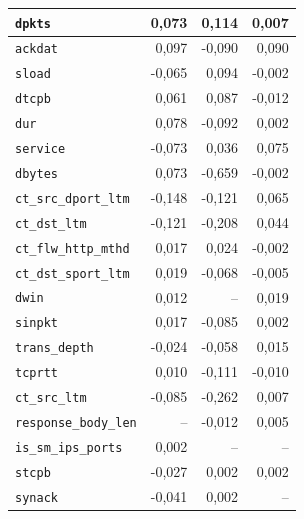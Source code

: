 \begin{table}[!ht]
\begin{tabular}{|l|r|r|r|}
        \hline
        \texttt{dpkts} & 0,073 & 0,114 & 0,007 \\
        \hline
        \texttt{ackdat} & 0,097 & -0,090 & 0,090 \\
        \hline
        \texttt{sload} & -0,065 & 0,094 & -0,002 \\
        \hline
        \texttt{dtcpb} & 0,061 & 0,087 & -0,012 \\
        \hline
        \texttt{dur} & 0,078 & -0,092 & 0,002 \\
        \hline
        \texttt{service} & -0,073 & 0,036 & 0,075 \\
        \hline
        \texttt{dbytes} & 0,073 & -0,659 & -0,002 \\
        \hline
        \texttt{ct\_src\_dport\_ltm} & -0,148 & -0,121 & 0,065 \\
        \hline
        \texttt{ct\_dst\_ltm} & -0,121 & -0,208 & 0,044 \\
        \hline
        \texttt{ct\_flw\_http\_mthd} & 0,017 & 0,024 & -0,002 \\
        \hline
        \texttt{ct\_dst\_sport\_ltm} & 0,019 & -0,068 & -0,005 \\
        \hline
        \texttt{dwin} & 0,012 & -- & 0,019 \\
        \hline
        \texttt{sinpkt} & 0,017 & -0,085 & 0,002 \\
        \hline
        \texttt{trans\_depth} & -0,024 & -0,058 & 0,015 \\
        \hline
        \texttt{tcprtt} & 0,010 & -0,111 & -0,010 \\
        \hline
        \texttt{ct\_src\_ltm} & -0,085 & -0,262 & 0,007 \\
        \hline
        \texttt{response\_body\_len} & -- & -0,012 & 0,005 \\
        \hline
        \texttt{is\_sm\_ips\_ports} & 0,002 & -- & -- \\
        \hline
        \texttt{stcpb} & -0,027 & 0,002 & 0,002 \\
        \hline
        \texttt{synack} & -0,041 & 0,002 & -- \\
        \hline
    \end{tabular}
    \label{tab:anexa-importanta}
\end{table}
